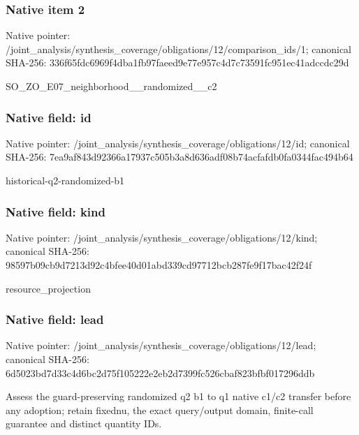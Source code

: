 \documentclass[10pt,a4paper]{article}
\begin{document}
\subsubsection{Native item 2}
Native pointer: /joint\_\allowbreak{}analysis/synthesis\_\allowbreak{}coverage/obligations/12/comparison\_\allowbreak{}ids/1; canonical SHA-256: 336f65fdc6969f4dba1fb97faeed9e77e957c4d7c73591fc951ec41adccdc29d

\begingroup\raggedright\sloppy SO\_\allowbreak{}ZO\_\allowbreak{}E07\_\allowbreak{}neighborhood\_\allowbreak{}\_\allowbreak{}randomized\_\allowbreak{}\_\allowbreak{}c2\par\endgroup

\subsubsection{Native field: id}
Native pointer: /joint\_\allowbreak{}analysis/synthesis\_\allowbreak{}coverage/obligations/12/id; canonical SHA-256: 7ea9af843d92366a17937c505b3a8d636adf08b74acfafdb0fa0344fac494b64

\begingroup\raggedright\sloppy historical-q2-randomized-b1\par\endgroup

\subsubsection{Native field: kind}
Native pointer: /joint\_\allowbreak{}analysis/synthesis\_\allowbreak{}coverage/obligations/12/kind; canonical SHA-256: 98597b09cb9d7213d92c4bfee40d01abd339cd97712bcb287fe9f17bac42f24f

\begingroup\raggedright\sloppy resource\_\allowbreak{}projection\par\endgroup

\subsubsection{Native field: lead}
Native pointer: /joint\_\allowbreak{}analysis/synthesis\_\allowbreak{}coverage/obligations/12/lead; canonical SHA-256: 6d5023bd7d33c4d6bc2d75f105222e2eb2d7399fc526cbaf823bfbf017296ddb

\begingroup\raggedright\sloppy Assess the guard-preserving randomized q2 b1 to q1 native c1/\allowbreak{}c2 transfer before any adoption;\allowbreak{} retain fixednu,\allowbreak{} the exact query/\allowbreak{}output domain,\allowbreak{} finite-call guarantee and distinct quantity IDs.\par\endgroup
\end{document}
